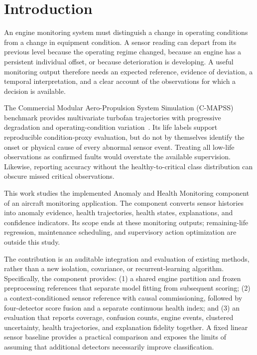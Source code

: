 \documentclass[conference]{IEEEtran}
\begin{document}
\section{Introduction}
An engine monitoring system must distinguish a change in operating conditions from a change in equipment condition. A sensor reading can depart from its previous level because the operating regime changed, because an engine has a persistent individual offset, or because deterioration is developing. A useful monitoring output therefore needs an expected reference, evidence of deviation, a temporal interpretation, and a clear account of the observations for which a decision is available.

The Commercial Modular Aero-Propulsion System Simulation (C-MAPSS) benchmark provides multivariate turbofan trajectories with progressive degradation and operating-condition variation~\cite{saxena2008,nasaData}. Its life labels support reproducible condition-proxy evaluation, but do not by themselves identify the onset or physical cause of every abnormal sensor event. Treating all low-life observations as confirmed faults would overstate the available supervision. Likewise, reporting accuracy without the healthy-to-critical class distribution can obscure missed critical observations.

This work studies the implemented Anomaly and Health Monitoring component of an aircraft monitoring application. The component converts sensor histories into anomaly evidence, health trajectories, health states, explanations, and confidence indicators. Its scope ends at these monitoring outputs; remaining-life regression, maintenance scheduling, and supervisory action optimization are outside this study.

The contribution is an auditable integration and evaluation of existing methods, rather than a new isolation, covariance, or recurrent-learning algorithm. Specifically, the component provides: (1) a shared engine partition and frozen preprocessing references that separate model fitting from subsequent scoring; (2) a context-conditioned sensor reference with causal commissioning, followed by four-detector score fusion and a separate continuous health index; and (3) an evaluation that reports coverage, confusion counts, engine events, clustered uncertainty, health trajectories, and explanation fidelity together. A fixed linear sensor baseline provides a practical comparison and exposes the limits of assuming that additional detectors necessarily improve classification.
\end{document}
